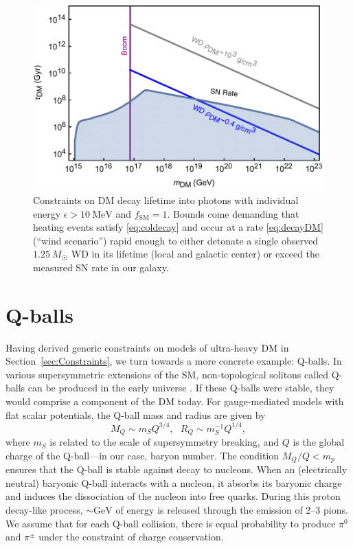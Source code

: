 \documentclass[twocolumn, preprintnumbers,amsmath,amssymb,prd, superscriptaddress]{revtex4}
\begin{document}
\begin{figure}
\includegraphics[scale=.45]{decayobservation.pdf}
\caption{Constraints on DM decay lifetime into photons with individual energy $\epsilon > 10~\text{MeV}$ and $f_\text{SM} = 1$. Bounds come demanding that heating events satisfy \eqref{eq:coldecay} and occur at a rate \eqref{eq:decayDM} (``wind scenario'') rapid enough to either detonate a single observed $1.25~M_{\astrosun}$ WD in its lifetime (local and galactic center) or exceed the measured SN rate in our galaxy.}
\label{fig:decayclasses}
\end{figure}

\section{Q-balls}
\label{sec:QBalls}

Having derived generic constraints on models of ultra-heavy DM in Section~\ref{sec:Constraints}, we turn towards a more concrete example: Q-balls.
In various supersymmetric extensions of the SM, non-topological solitons called Q-balls can be produced in the early universe \cite{Coleman:1985ki, Kusenko:1997si}.
If these Q-balls were stable, they would comprise a component of the DM today.
For gauge-mediated models with flat scalar potentials, the Q-ball mass and radius are given by
\begin{equation}
\label{eq:Qballprop}
M_Q \sim m_S Q^{3/4}, ~~~ R_Q \sim m_S^{-1} Q^{1/4},
\end{equation}
where $m_S$ is related to the scale of supersymmetry breaking, and $Q$ is the global charge of the Q-ball---in our case, baryon number.
The condition $M_Q/Q < m_p$ ensures that the Q-ball is stable against decay to nucleons.
When an (electrically neutral) baryonic Q-ball interacts with a nucleon, it absorbs its baryonic charge and induces the dissociation of the nucleon into free quarks.
During this proton decay-like process, $\sim \text{GeV}$ of energy is released through the emission of 2--3 pions.
We assume that for each Q-ball collision, there is equal probability to produce $\pi^0$ and $\pi^\pm$ under the constraint of charge conservation.
\end{document}
